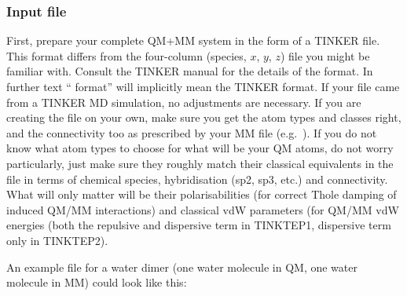 \documentclass[letterpaper,10pt,english]{sphinxmanual}
\begin{document}
\subsubsection{Input  file}
\label{\detokenize{tinktep:input-xyz-file}}
First, prepare your complete QM+MM system in the form of a TINKER
 file. This format differs from the four-column (species,
\(x\), \(y\), \(z\))  file you might be familiar
with. Consult the TINKER manual for the details of the format. In
further text “ format” will implicitly mean the TINKER 
format. If your  file came from a TINKER MD simulation, no
adjustments are necessary. If you are creating the  file on your
own, make sure you get the atom types and classes right, and the
connectivity too \textendash{} as prescribed by your MM  file
(e.g. ). If you do not know what atom types to choose
for what will be your QM atoms, do not worry particularly, just make
sure they roughly match their classical equivalents in the  file
in terms of chemical species, hybridisation (sp2, sp3, etc.) and
connectivity. What will only matter will be their polarisabilities (for
correct Thole damping of induced QM/MM interactions) and classical vdW
parameters (for QM/MM vdW energies (both the repulsive and dispersive
term in TINKTEP1, dispersive term only in TINKTEP2).

An example  file for a water dimer (one water molecule in QM,
one water molecule in MM) could look like this:

%
\begin{sphinxVerbatim}[commandchars=\\\{\}]
                              
                         
                         
                             
                       
                        
\end{sphinxVerbatim}
\end{document}
